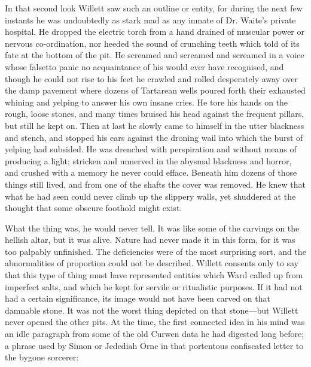     In that second look Willett saw such an outline or entity, for during the next few instants he was undoubtedly as stark mad as any inmate of Dr. Waite's private hospital. He dropped the electric torch from a hand drained of muscular power or nervous co-ordination, nor heeded the sound of crunching teeth which told of its fate at the bottom of the pit. He screamed and screamed and screamed in a voice whose falsetto panic no acquaintance of his would ever have recognised, and though he could not rise to his feet he crawled and rolled desperately away over the damp pavement where dozens of Tartarean wells poured forth their exhausted whining and yelping to answer his own insane cries. He tore his hands on the rough, loose stones, and many times bruised his head against the frequent pillars, but still he kept on. Then at last he slowly came to himself in the utter blackness and stench, and stopped his ears against the droning wail into which the burst of yelping had subsided. He was drenched with perspiration and without means of producing a light; stricken and unnerved in the abysmal blackness and horror, and crushed with a memory he never could efface. Beneath him dozens of those things still lived, and from one of the shafts the cover was removed. He knew that what he had seen could never climb up the slippery walls, yet shuddered at the thought that some obscure foothold might exist.

What the thing was, he would never tell. It was like some of the carvings on the hellish altar, but it was alive. Nature had never made it in this form, for it was too palpably unfinished. The deficiencies were of the most surprising sort, and the abnormalities of proportion could not be described. Willett consents only to say that this type of thing must have represented entities which Ward called up from imperfect salts, and which he kept for servile or ritualistic purposes. If it had not had a certain significance, its image would not have been carved on that damnable stone. It was not the worst thing depicted on that stone—but Willett never opened the other pits. At the time, the first connected idea in his mind was an idle paragraph from some of the old Curwen data he had digested long before; a phrase used by Simon or Jedediah Orne in that portentous confiscated letter to the bygone sorcerer:
